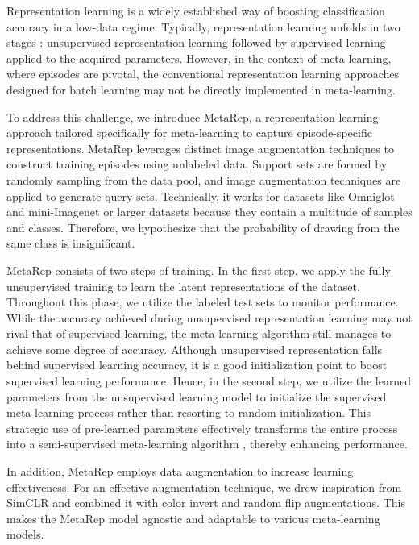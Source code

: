 Representation learning is a widely established way \cite{9770283, 9363924} of boosting classification accuracy in a low-data regime. Typically, representation learning unfolds in two stages  \cite{chen2020simple, grill2020bootstrap}: unsupervised representation learning followed by supervised learning applied to the acquired parameters. However, in the context of meta-learning, where episodes are pivotal, the conventional representation learning approaches designed for batch learning may not be directly implemented in meta-learning. 

To address this challenge, we introduce MetaRep, a representation-learning approach tailored specifically for meta-learning to capture episode-specific representations. MetaRep leverages distinct image augmentation techniques to construct training episodes using unlabeled data. Support sets are formed by randomly sampling from the data pool, and image augmentation techniques are applied to generate query sets. Technically, it works for datasets like Omniglot \cite{lake2015human} and mini-Imagenet \cite{ILSVRC15} or larger datasets because they contain a multitude of samples and classes. Therefore, we hypothesize that the probability of drawing from the same class is insignificant.

MetaRep consists of two steps of training. In the first step, we apply the fully unsupervised training to learn the latent representations of the dataset. Throughout this phase, we utilize the labeled test sets to monitor performance. While the accuracy achieved during unsupervised representation learning may not rival that of supervised learning, the meta-learning algorithm still manages to achieve some degree of accuracy.  Although unsupervised representation falls behind supervised learning accuracy, it is a good initialization point to boost supervised learning performance. Hence, in the second step, we utilize the learned parameters from the unsupervised learning model to initialize the supervised meta-learning process rather than resorting to random initialization. This strategic use of pre-learned parameters effectively transforms the entire process into a semi-supervised meta-learning algorithm \cite{sun2019meta}, thereby enhancing performance.

In addition, MetaRep employs data augmentation to increase learning effectiveness. For an effective augmentation technique, we drew inspiration from SimCLR \cite{chen2020simple} and combined it with color invert and random flip augmentations. This makes the MetaRep model agnostic and adaptable to various meta-learning models. 


